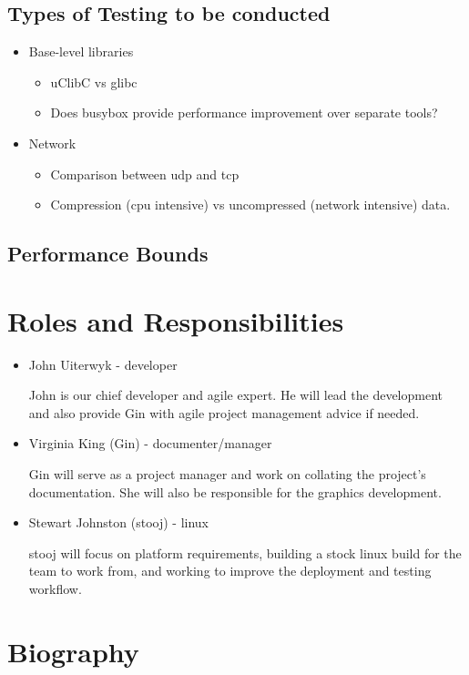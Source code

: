 \documentclass[a4paper]{article}
\begin{document}
\subsection{Types of Testing to be conducted}

\begin{itemize}
  \item Base-level libraries
    \begin{itemize}
      \item uClibC vs glibc
      \item Does busybox provide performance improvement over separate tools?
    \end{itemize}
  \item Network
    \begin{itemize}
      \item Comparison between udp and tcp
      \item Compression (cpu intensive) vs uncompressed (network intensive)
        data.
    \end{itemize}
\end{itemize}

\subsection{Performance Bounds}

\section{Roles and Responsibilities}

\begin{itemize}
  \item John Uiterwyk - developer

    John is our chief developer and agile expert. He will lead the development
    and also provide Gin with agile project management advice if needed.

  \item Virginia King (Gin) - documenter/manager

    Gin will serve as a project manager and work on collating the project's
    documentation. She will also be responsible for the graphics development.

  \item Stewart Johnston (stooj) - linux

    stooj will focus on platform requirements, building a stock linux build
    for the team to work from, and working to improve the deployment and
    testing workflow.

\end{itemize}

\section{Biography}
\end{document}
